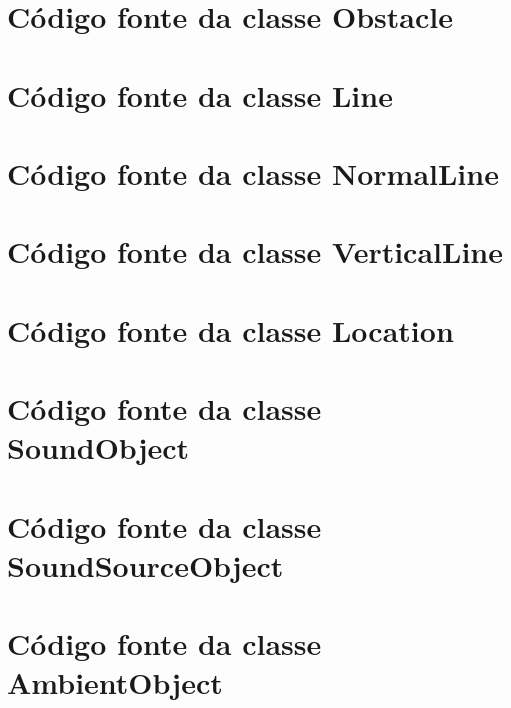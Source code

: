 \begin{apendicesenv}


\chapter{Código fonte da classe Obstacle}




\chapter{Código fonte da classe Line}




\chapter{Código fonte da classe NormalLine}




\chapter{Código fonte da classe VerticalLine}



\chapter{Código fonte da classe Location}



\chapter{Código fonte da classe SoundObject}



\chapter{Código fonte da classe SoundSourceObject}



\chapter{Código fonte da classe AmbientObject}



\end{apendicesenv}
